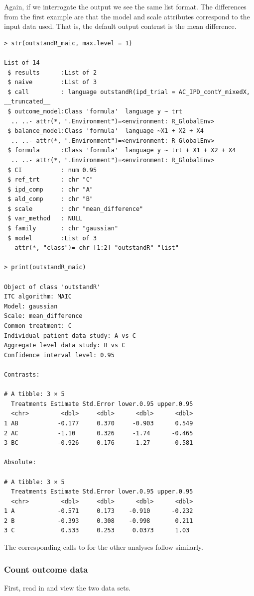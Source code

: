 \documentclass[article]{jss}
\begin{document}
Again, if we interrogate the output we see the same list format. The differences from the first example are that the model and scale attributes correspond to the input data used. That is, the default output contrast is the mean difference.

\begin{verbatim}
> str(outstandR_maic, max.level = 1)

List of 14
 $ results      :List of 2
 $ naive        :List of 3
 $ call         : language outstandR(ipd_trial = AC_IPD_contY_mixedX, __truncated__
 $ outcome_model:Class 'formula'  language y ~ trt
  .. ..- attr(*, ".Environment")=<environment: R_GlobalEnv> 
 $ balance_model:Class 'formula'  language ~X1 + X2 + X4
  .. ..- attr(*, ".Environment")=<environment: R_GlobalEnv> 
 $ formula      :Class 'formula'  language y ~ trt + X1 + X2 + X4
  .. ..- attr(*, ".Environment")=<environment: R_GlobalEnv> 
 $ CI           : num 0.95
 $ ref_trt      : chr "C"
 $ ipd_comp     : chr "A"
 $ ald_comp     : chr "B"
 $ scale        : chr "mean_difference"
 $ var_method   : NULL
 $ family       : chr "gaussian"
 $ model        :List of 3
 - attr(*, "class")= chr [1:2] "outstandR" "list"

> print(outstandR_maic)

Object of class 'outstandR' 
ITC algorithm: MAIC 
Model: gaussian 
Scale: mean_difference 
Common treatment: C 
Individual patient data study: A vs C 
Aggregate level data study: B vs C 
Confidence interval level: 0.95 

Contrasts:

# A tibble: 3 × 5
  Treatments Estimate Std.Error lower.0.95 upper.0.95
  <chr>         <dbl>     <dbl>      <dbl>      <dbl>
1 AB           -0.177     0.370     -0.903      0.549
2 AC           -1.10      0.326     -1.74      -0.465
3 BC           -0.926     0.176     -1.27      -0.581

Absolute:

# A tibble: 3 × 5
  Treatments Estimate Std.Error lower.0.95 upper.0.95
  <chr>         <dbl>     <dbl>      <dbl>      <dbl>
1 A            -0.571     0.173    -0.910      -0.232
2 B            -0.393     0.308    -0.998       0.211
3 C             0.533     0.253     0.0373      1.03 
\end{verbatim}

The corresponding calls to  for the other analyses follow similarly.

% 
\subsubsection{Count outcome data}
First, read in and view the two data sets.
\end{document}
